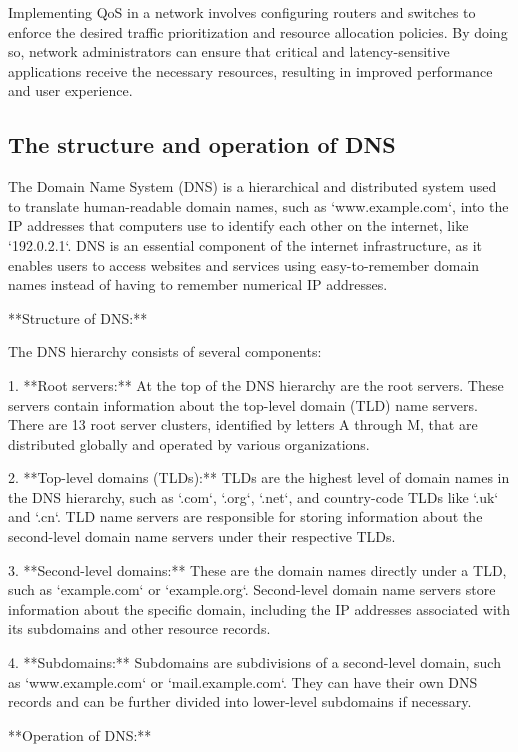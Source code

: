 \documentclass{article}
\begin{document}
Implementing QoS in a network involves configuring routers and switches to enforce the desired traffic prioritization and resource allocation policies. By doing so, network administrators can ensure that critical and latency-sensitive applications receive the necessary resources, resulting in improved performance and user experience.


\subsection{The structure and operation of DNS}

The Domain Name System (DNS) is a hierarchical and distributed system used to translate human-readable domain names, such as `www.example.com`, into the IP addresses that computers use to identify each other on the internet, like `192.0.2.1`. DNS is an essential component of the internet infrastructure, as it enables users to access websites and services using easy-to-remember domain names instead of having to remember numerical IP addresses.

**Structure of DNS:**

The DNS hierarchy consists of several components:

1. **Root servers:** At the top of the DNS hierarchy are the root servers. These servers contain information about the top-level domain (TLD) name servers. There are 13 root server clusters, identified by letters A through M, that are distributed globally and operated by various organizations.

2. **Top-level domains (TLDs):** TLDs are the highest level of domain names in the DNS hierarchy, such as `.com`, `.org`, `.net`, and country-code TLDs like `.uk` and `.cn`. TLD name servers are responsible for storing information about the second-level domain name servers under their respective TLDs.

3. **Second-level domains:** These are the domain names directly under a TLD, such as `example.com` or `example.org`. Second-level domain name servers store information about the specific domain, including the IP addresses associated with its subdomains and other resource records.

4. **Subdomains:** Subdomains are subdivisions of a second-level domain, such as `www.example.com` or `mail.example.com`. They can have their own DNS records and can be further divided into lower-level subdomains if necessary.

**Operation of DNS:**
\end{document}
